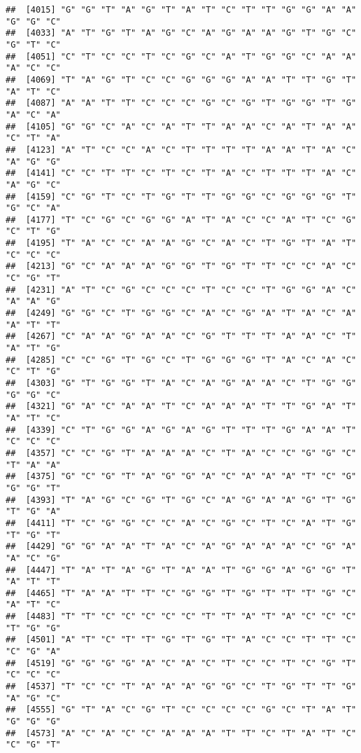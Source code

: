\documentclass[
]{article}
\begin{document}
\begin{verbatim}
##  [4015] "G" "G" "T" "A" "G" "T" "A" "T" "C" "T" "T" "G" "G" "A" "A" "G" "G" "C"
##  [4033] "A" "T" "G" "T" "A" "G" "C" "A" "G" "A" "A" "G" "T" "G" "C" "G" "T" "C"
##  [4051] "C" "T" "C" "C" "T" "C" "G" "C" "A" "T" "G" "G" "C" "A" "A" "A" "C" "C"
##  [4069] "T" "A" "G" "T" "C" "C" "G" "G" "G" "A" "A" "T" "T" "G" "T" "A" "T" "C"
##  [4087] "A" "A" "T" "T" "C" "C" "C" "G" "C" "G" "T" "G" "G" "T" "G" "A" "C" "A"
##  [4105] "G" "G" "C" "A" "C" "A" "T" "T" "A" "A" "C" "A" "T" "A" "A" "C" "T" "A"
##  [4123] "A" "T" "C" "C" "A" "C" "T" "T" "T" "T" "A" "A" "T" "A" "C" "A" "G" "G"
##  [4141] "C" "C" "T" "T" "C" "T" "C" "T" "A" "C" "T" "T" "T" "A" "C" "A" "G" "C"
##  [4159] "C" "G" "T" "C" "T" "G" "T" "T" "G" "G" "C" "G" "G" "G" "T" "G" "C" "A"
##  [4177] "T" "C" "G" "C" "G" "G" "A" "T" "A" "C" "C" "A" "T" "C" "G" "C" "T" "G"
##  [4195] "T" "A" "C" "C" "A" "A" "G" "C" "A" "C" "T" "G" "T" "A" "T" "C" "C" "C"
##  [4213] "G" "C" "A" "A" "A" "G" "G" "T" "G" "T" "T" "C" "C" "A" "C" "C" "G" "T"
##  [4231] "A" "T" "C" "G" "C" "C" "C" "T" "C" "C" "T" "G" "G" "A" "C" "A" "A" "G"
##  [4249] "G" "G" "C" "T" "G" "G" "C" "A" "C" "G" "A" "T" "A" "C" "A" "A" "T" "T"
##  [4267] "C" "A" "A" "G" "A" "A" "C" "G" "T" "T" "T" "A" "A" "C" "T" "A" "T" "G"
##  [4285] "C" "C" "G" "T" "G" "C" "T" "G" "G" "G" "T" "A" "C" "A" "C" "C" "T" "G"
##  [4303] "G" "T" "G" "G" "T" "A" "C" "A" "G" "A" "A" "C" "T" "G" "G" "G" "G" "C"
##  [4321] "G" "A" "C" "A" "A" "T" "C" "A" "A" "A" "T" "T" "G" "A" "T" "A" "T" "C"
##  [4339] "C" "T" "G" "G" "A" "G" "A" "G" "T" "T" "T" "G" "A" "A" "T" "C" "C" "C"
##  [4357] "C" "C" "G" "T" "A" "A" "A" "C" "T" "A" "C" "C" "G" "G" "C" "T" "A" "A"
##  [4375] "G" "C" "G" "T" "A" "G" "G" "A" "C" "A" "A" "A" "T" "C" "G" "G" "G" "T"
##  [4393] "T" "A" "G" "C" "G" "T" "G" "C" "A" "G" "A" "A" "G" "T" "G" "T" "G" "A"
##  [4411] "T" "C" "G" "G" "C" "C" "A" "C" "G" "C" "T" "C" "A" "T" "G" "T" "G" "T"
##  [4429] "G" "G" "A" "A" "T" "A" "C" "A" "G" "A" "A" "A" "C" "G" "A" "A" "C" "G"
##  [4447] "T" "A" "T" "A" "G" "T" "A" "A" "T" "G" "G" "A" "G" "G" "T" "A" "T" "T"
##  [4465] "T" "A" "A" "T" "T" "C" "G" "G" "T" "G" "T" "T" "T" "G" "C" "A" "T" "C"
##  [4483] "T" "T" "C" "C" "C" "C" "C" "T" "T" "A" "T" "A" "C" "C" "C" "T" "G" "G"
##  [4501] "A" "T" "C" "T" "T" "G" "T" "G" "T" "A" "C" "C" "T" "T" "C" "C" "G" "A"
##  [4519] "G" "G" "G" "G" "A" "C" "A" "C" "T" "C" "C" "T" "C" "G" "T" "C" "C" "C"
##  [4537] "T" "C" "C" "T" "A" "A" "A" "G" "G" "C" "T" "G" "T" "T" "G" "A" "G" "C"
##  [4555] "G" "T" "A" "C" "G" "T" "C" "C" "C" "C" "G" "C" "T" "A" "T" "G" "G" "G"
##  [4573] "A" "C" "A" "C" "C" "A" "A" "A" "T" "T" "C" "T" "A" "T" "C" "C" "G" "T"

\end{verbatim}
\end{document}
